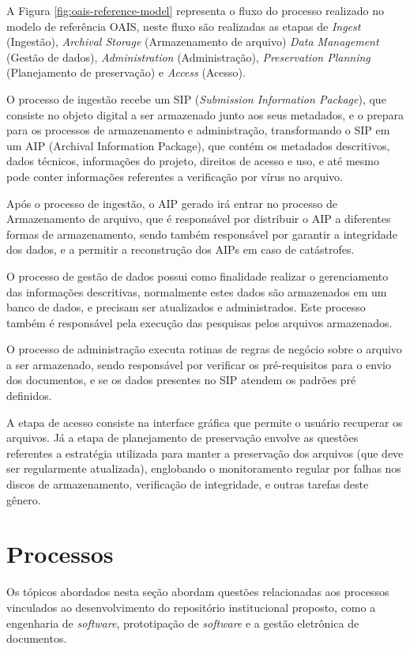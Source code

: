A Figura \ref{fig:oais-reference-model} representa o fluxo do processo
realizado no modelo de referência OAIS, neste fluxo são realizadas as
etapas de \emph{Ingest} (Ingestão), \emph{Archival Storage} (Armazenamento de arquivo)
\emph{Data Management} (Gestão de dados), \emph{Administration} (Administração),
\emph{Preservation Planning} (Planejamento de preservação) e \emph{Access} (Acesso).

O processo de ingestão recebe um SIP (\emph{Submission Information Package}),
que consiste no objeto digital a ser armazenado junto aos seus metadados, e o
prepara para os processos de armazenamento e administração, transformando o SIP
em um AIP (Archival Information Package), que contém os metadados descritivos,
dados técnicos, informações do projeto, direitos de acesso e uso, e
até mesmo pode conter informações referentes a verificação por vírus no arquivo.

Após o processo de ingestão, o AIP gerado irá entrar no processo de
Armazenamento de arquivo, que é responsável por distribuir o AIP a
diferentes formas de armazenamento, sendo também responsável
por garantir a integridade dos dados, e a permitir a reconstrução dos AIPs em caso
de catástrofes.

O processo de gestão de dados possui como finalidade realizar o gerenciamento
das informações descritivas, normalmente estes dados são armazenados em um
banco de dados, e precisam ser atualizados e administrados. Este processo
também é responsável pela execução das pesquisas pelos arquivos armazenados.

O processo de administração executa rotinas de regras de negócio sobre o arquivo a
ser armazenado, sendo responsável por verificar os pré-requisitos para o
envio dos documentos, e se os dados presentes no SIP atendem os padrões
pré definidos.

A etapa de acesso consiste na interface gráfica que permite o usuário
recuperar os arquivos. Já a etapa de planejamento de preservação
envolve as questões referentes a estratégia utilizada para manter a preservação
dos arquivos (que deve ser regularmente atualizada), englobando o monitoramento
regular por falhas nos discos de armazenamento, verificação de integridade,
e outras tarefas deste gênero.

\section{Processos}\label{sec:process}

Os tópicos abordados nesta seção abordam questões relacionadas
aos processos vinculados ao desenvolvimento do repositório institucional proposto,
como a engenharia de \emph{software}, prototipação de \emph{software} e
a gestão eletrônica de documentos.

